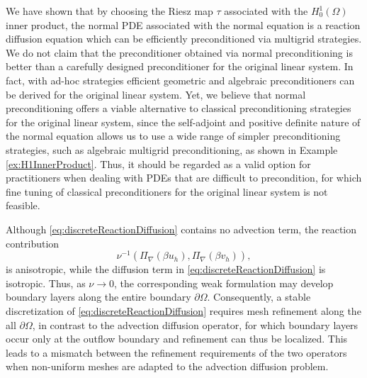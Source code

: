 \documentclass[hidelinks,onefignum,onetabnum]{siamart220329}
\begin{document}
We have shown that by choosing the Riesz map $\tau$ associated with the $H^1_0(\Omega)$ inner product, the normal PDE associated with the normal equation is a reaction diffusion equation which can be efficiently preconditioned via multigrid strategies.
We do not claim that the preconditioner obtained via normal preconditioning is better than a carefully designed preconditioner for the original linear system.
In fact, with ad-hoc strategies efficient geometric \cite{Elman} and algebraic \cite{air,air2,air3} preconditioners can be derived for the original linear system.
Yet, we believe that normal preconditioning offers a viable alternative to classical preconditioning strategies for the original linear system, since the self-adjoint and positive definite nature of the normal equation allows us to use a wide range of simpler preconditioning strategies, such as algebraic multigrid preconditioning, as shown in Example \ref{ex:H1InnerProduct}.
Thus, it should be regarded as a valid option for practitioners when dealing with PDEs that are difficult to precondition, for which fine tuning of classical preconditioners for the original linear system is not feasible.
\begin{remark}
    Although \eqref{eq:discreteReactionDiffusion} contains no advection term, the reaction contribution
    \begin{equation}
        \nu^{-1} (\Pi_{\nabla}(\beta u_h), \Pi_{\nabla} (\beta v_h)),
    \end{equation}
    is anisotropic, while the diffusion term in \eqref{eq:discreteReactionDiffusion} is isotropic. Thus, as $\nu \to 0$, the corresponding weak formulation may develop boundary layers along the entire boundary $\partial \Omega$.
    Consequently, a stable discretization of \eqref{eq:discreteReactionDiffusion} requires mesh refinement along the all $\partial \Omega$, in contrast to the advection diffusion operator, for which boundary layers occur only at the outflow boundary and refinement can thus be localized. This leads to a mismatch between the refinement requirements of the two operators when non-uniform meshes are adapted to the advection diffusion problem.
\end{remark}
\end{document}
